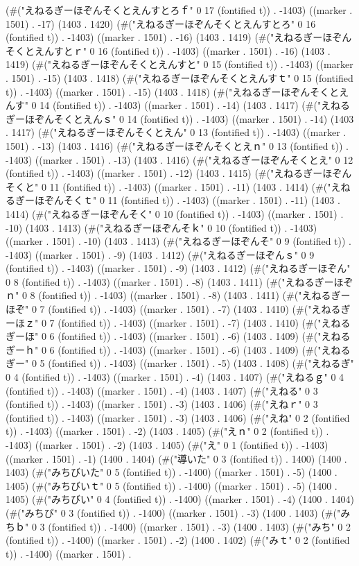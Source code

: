(#("えねるぎーほぞんそくとえんすとろｆ" 0 17 (fontified t)) . -1403) ((marker . 1501) . -17) (1403 . 1420) (#("えねるぎーほぞんそくとえんすとろ" 0 16 (fontified t)) . -1403) ((marker . 1501) . -16) (1403 . 1419) (#("えねるぎーほぞんそくとえんすとｒ" 0 16 (fontified t)) . -1403) ((marker . 1501) . -16) (1403 . 1419) (#("えねるぎーほぞんそくとえんすと" 0 15 (fontified t)) . -1403) ((marker . 1501) . -15) (1403 . 1418) (#("えねるぎーほぞんそくとえんすｔ" 0 15 (fontified t)) . -1403) ((marker . 1501) . -15) (1403 . 1418) (#("えねるぎーほぞんそくとえんす" 0 14 (fontified t)) . -1403) ((marker . 1501) . -14) (1403 . 1417) (#("えねるぎーほぞんそくとえんｓ" 0 14 (fontified t)) . -1403) ((marker . 1501) . -14) (1403 . 1417) (#("えねるぎーほぞんそくとえん" 0 13 (fontified t)) . -1403) ((marker . 1501) . -13) (1403 . 1416) (#("えねるぎーほぞんそくとえｎ" 0 13 (fontified t)) . -1403) ((marker . 1501) . -13) (1403 . 1416) (#("えねるぎーほぞんそくとえ" 0 12 (fontified t)) . -1403) ((marker . 1501) . -12) (1403 . 1415) (#("えねるぎーほぞんそくと" 0 11 (fontified t)) . -1403) ((marker . 1501) . -11) (1403 . 1414) (#("えねるぎーほぞんそくｔ" 0 11 (fontified t)) . -1403) ((marker . 1501) . -11) (1403 . 1414) (#("えねるぎーほぞんそく" 0 10 (fontified t)) . -1403) ((marker . 1501) . -10) (1403 . 1413) (#("えねるぎーほぞんそｋ" 0 10 (fontified t)) . -1403) ((marker . 1501) . -10) (1403 . 1413) (#("えねるぎーほぞんそ" 0 9 (fontified t)) . -1403) ((marker . 1501) . -9) (1403 . 1412) (#("えねるぎーほぞんｓ" 0 9 (fontified t)) . -1403) ((marker . 1501) . -9) (1403 . 1412) (#("えねるぎーほぞん" 0 8 (fontified t)) . -1403) ((marker . 1501) . -8) (1403 . 1411) (#("えねるぎーほぞｎ" 0 8 (fontified t)) . -1403) ((marker . 1501) . -8) (1403 . 1411) (#("えねるぎーほぞ" 0 7 (fontified t)) . -1403) ((marker . 1501) . -7) (1403 . 1410) (#("えねるぎーほｚ" 0 7 (fontified t)) . -1403) ((marker . 1501) . -7) (1403 . 1410) (#("えねるぎーほ" 0 6 (fontified t)) . -1403) ((marker . 1501) . -6) (1403 . 1409) (#("えねるぎーｈ" 0 6 (fontified t)) . -1403) ((marker . 1501) . -6) (1403 . 1409) (#("えねるぎー" 0 5 (fontified t)) . -1403) ((marker . 1501) . -5) (1403 . 1408) (#("えねるぎ" 0 4 (fontified t)) . -1403) ((marker . 1501) . -4) (1403 . 1407) (#("えねるｇ" 0 4 (fontified t)) . -1403) ((marker . 1501) . -4) (1403 . 1407) (#("えねる" 0 3 (fontified t)) . -1403) ((marker . 1501) . -3) (1403 . 1406) (#("えねｒ" 0 3 (fontified t)) . -1403) ((marker . 1501) . -3) (1403 . 1406) (#("えね" 0 2 (fontified t)) . -1403) ((marker . 1501) . -2) (1403 . 1405) (#("えｎ" 0 2 (fontified t)) . -1403) ((marker . 1501) . -2) (1403 . 1405) (#("え" 0 1 (fontified t)) . -1403) ((marker . 1501) . -1) (1400 . 1404) (#("導いた" 0 3 (fontified t)) . 1400) (1400 . 1403) (#("みちびいた" 0 5 (fontified t)) . -1400) ((marker . 1501) . -5) (1400 . 1405) (#("みちびいｔ" 0 5 (fontified t)) . -1400) ((marker . 1501) . -5) (1400 . 1405) (#("みちびい" 0 4 (fontified t)) . -1400) ((marker . 1501) . -4) (1400 . 1404) (#("みちび" 0 3 (fontified t)) . -1400) ((marker . 1501) . -3) (1400 . 1403) (#("みちｂ" 0 3 (fontified t)) . -1400) ((marker . 1501) . -3) (1400 . 1403) (#("みち" 0 2 (fontified t)) . -1400) ((marker . 1501) . -2) (1400 . 1402) (#("みｔ" 0 2 (fontified t)) . -1400) ((marker . 1501) . 
